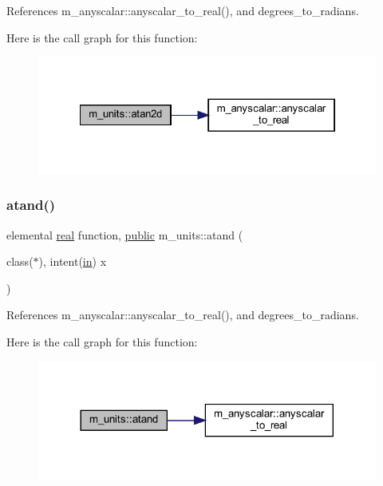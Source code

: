References m\+\_\+anyscalar\+::anyscalar\+\_\+to\+\_\+real(), and degrees\+\_\+to\+\_\+radians.

Here is the call graph for this function\+:
\nopagebreak
\begin{figure}[H]
\begin{center}
\leavevmode
\includegraphics[width=322pt]{namespacem__units_a09403aaa43be5c74f7b9a3c2df2d1460_cgraph}
\end{center}
\end{figure}
\mbox{\label{namespacem__units_ac54e5d4cedc06c56d0de8e0138781be9}} 
\subsubsection{\texorpdfstring{atand()}{atand()}}
{\footnotesize\ttfamily elemental \hyperlink{read__watch_83_8txt_abdb62bde002f38ef75f810d3a905a823}{real} function, \hyperlink{M__stopwatch_83_8txt_a2f74811300c361e53b430611a7d1769f}{public} m\+\_\+units\+::atand (\begin{DoxyParamCaption}\item[{class($\ast$), intent(\hyperlink{M__journal_83_8txt_afce72651d1eed785a2132bee863b2f38}{in})}]{x }\end{DoxyParamCaption})}



References m\+\_\+anyscalar\+::anyscalar\+\_\+to\+\_\+real(), and degrees\+\_\+to\+\_\+radians.

Here is the call graph for this function\+:
\nopagebreak
\begin{figure}[H]
\begin{center}
\leavevmode
\includegraphics[width=317pt]{namespacem__units_ac54e5d4cedc06c56d0de8e0138781be9_cgraph}
\end{center}
\end{figure}
\mbox{\label{namespacem__units_a09d8d6552dedf64faf635ea0ea6606ab}} 
